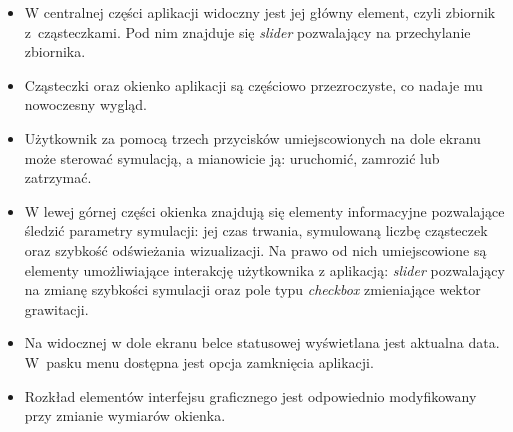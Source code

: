 \begin{itemize}
    \item
W centralnej części aplikacji widoczny jest jej główny element, czyli zbiornik z~cząsteczkami. Pod nim znajduje się \textit{slider} pozwalający na przechylanie zbiornika.

    \item
Cząsteczki oraz okienko aplikacji są częściowo przezroczyste, co nadaje mu nowoczesny wygląd.

    \item
Użytkownik za pomocą trzech przycisków umiejscowionych na dole ekranu może sterować symulacją, a mianowicie ją: uruchomić, zamrozić lub zatrzymać.

    \item
W lewej górnej części okienka znajdują się elementy informacyjne pozwalające śledzić parametry symulacji: jej czas trwania, symulowaną liczbę cząsteczek oraz szybkość odświeżania wizualizacji. Na prawo od nich umiejscowione są elementy umożliwiające interakcję użytkownika z aplikacją: \textit{slider} pozwalający na zmianę szybkości symulacji oraz pole typu \textit{checkbox} zmieniające wektor grawitacji.

    \item
Na widocznej w dole ekranu belce statusowej wyświetlana jest aktualna data. W~pasku menu dostępna jest opcja zamknięcia aplikacji.

    \item
Rozkład elementów interfejsu graficznego jest odpowiednio modyfikowany przy zmianie wymiarów okienka.
\end{itemize}
